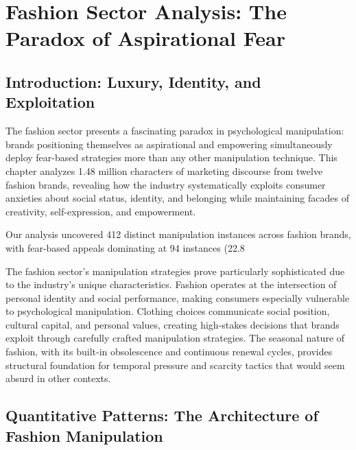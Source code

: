 
\chapter{Fashion Sector Analysis: The Paradox of Aspirational Fear}
\label{ch:fashion}

\section{Introduction: Luxury, Identity, and Exploitation}
\label{sec:fashion_intro}

The fashion sector presents a fascinating paradox in psychological manipulation: brands positioning themselves as aspirational and empowering simultaneously deploy fear-based strategies more than any other manipulation technique. This chapter analyzes 1.48 million characters of marketing discourse from twelve fashion brands, revealing how the industry systematically exploits consumer anxieties about social status, identity, and belonging while maintaining facades of creativity, self-expression, and empowerment.

Our analysis uncovered 412 distinct manipulation instances across fashion brands, with fear-based appeals dominating at 94 instances (22.8%

The fashion sector's manipulation strategies prove particularly sophisticated due to the industry's unique characteristics. Fashion operates at the intersection of personal identity and social performance, making consumers especially vulnerable to psychological manipulation. Clothing choices communicate social position, cultural capital, and personal values, creating high-stakes decisions that brands exploit through carefully crafted manipulation strategies. The seasonal nature of fashion, with its built-in obsolescence and continuous renewal cycles, provides structural foundation for temporal pressure and scarcity tactics that would seem absurd in other contexts.

\section{Quantitative Patterns: The Architecture of Fashion Manipulation}
\label{sec:fashion_quant}

